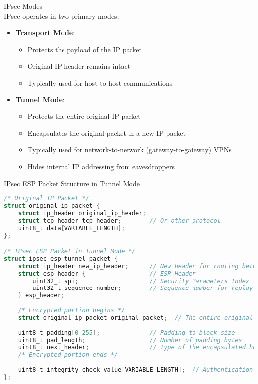 \begin{concept}{IPsec Modes}\\
IPsec operates in two primary modes:
\begin{itemize}
    \item \textbf{Transport Mode}:
    \begin{itemize}
        \item Protects the payload of the IP packet
        \item Original IP header remains intact
        \item Typically used for host-to-host communications
    \end{itemize}
    \item \textbf{Tunnel Mode}:
    \begin{itemize}
        \item Protects the entire original IP packet
        \item Encapsulates the original packet in a new IP packet
        \item Typically used for network-to-network (gateway-to-gateway) VPNs
        \item Hides internal IP addressing from eavesdroppers
    \end{itemize}
\end{itemize}
\end{concept}

\begin{code}{IPsec ESP Packet Structure in Tunnel Mode}\\
\begin{lstlisting}[language=C, style=basesmol]
/* Original IP Packet */
struct original_ip_packet {
    struct ip_header original_ip_header;
    struct tcp_header tcp_header;        // Or other protocol
    uint8_t data[VARIABLE_LENGTH];
};

/* IPsec ESP Packet in Tunnel Mode */
struct ipsec_esp_tunnel_packet {
    struct ip_header new_ip_header;      // New header for routing between gateways
    struct esp_header {                  // ESP Header
        uint32_t spi;                    // Security Parameters Index
        uint32_t sequence_number;        // Sequence number for replay protection
    } esp_header;
    
    /* Encrypted portion begins */
    struct original_ip_packet original_packet;  // The entire original packet
    
    uint8_t padding[0-255];              // Padding to block size
    uint8_t pad_length;                  // Number of padding bytes
    uint8_t next_header;                 // Type of the encapsulated header
    /* Encrypted portion ends */
    
    uint8_t integrity_check_value[VARIABLE_LENGTH];  // Authentication data
};
\end{lstlisting}
\end{code}

